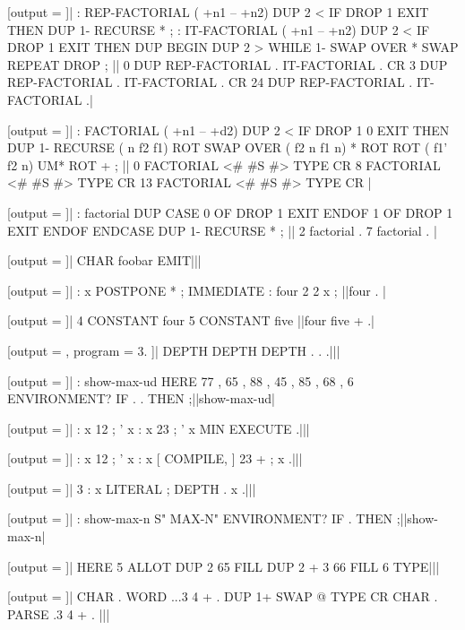 [output = \result]|
  : REP-FACTORIAL ( +n1 -- +n2)
  DUP 2 < IF DROP 1 EXIT THEN
  DUP 1- RECURSE *
  ;
  : IT-FACTORIAL ( +n1 -- +n2)
  DUP 2 < IF DROP 1 EXIT THEN
  DUP
  BEGIN DUP 2 > WHILE
  1- SWAP OVER * SWAP
  REPEAT DROP
  ;
||
0 DUP REP-FACTORIAL . IT-FACTORIAL . CR
3 DUP REP-FACTORIAL . IT-FACTORIAL . CR
24 DUP REP-FACTORIAL . IT-FACTORIAL .|
\typeout{\result}

[output = \result]|
  : FACTORIAL ( +n1 -- +d2)
  DUP 2 < IF DROP 1 0 EXIT THEN
  DUP 1- RECURSE ( n f2 f1)
  ROT SWAP OVER ( f2 n f1 n)
  * ROT ROT ( f1' f2 n)
  UM* ROT +
  ;
||
0 FACTORIAL <# #S #> TYPE CR
8 FACTORIAL <# #S #> TYPE CR
13 FACTORIAL <# #S #> TYPE CR
|
\typeout{\result}

[output = \result]|
  : factorial DUP
  CASE
    0 OF DROP 1 EXIT ENDOF
    1 OF DROP 1 EXIT ENDOF
  ENDCASE
  DUP 1- RECURSE * ;
||
  2 factorial .
  7 factorial .
|
\typeout{\result}

[output = \result]|
  CHAR foobar EMIT|||
\typeout{\result}

[output = \result]|
  : x POSTPONE * ; IMMEDIATE
  : four 2 2 x ;
||four . |
\typeout{\result}

[output = \result]|
  4 CONSTANT four
  5 CONSTANT five
||four five + .|
\typeout{\result}

[output = \result, program = { 3\space . }]|
  DEPTH DEPTH DEPTH . . .|||
\typeout{\result}

[output = \result]|
  : show-max-ud HERE 77 , 65 , 88 , 45 , 85 , 68 ,
    6 ENVIRONMENT? IF . . THEN ;||show-max-ud|
\typeout{\result}

[output = \result]|
  : x 12 ; ' x
  : x 23 ; ' x
  MIN EXECUTE .|||
\typeout{\result}

[output = \result]|
  : x 12 ; ' x
  : x [ COMPILE, ] 23 + ; x .|||
\typeout{\result}

[output = \result]|
  3 : x LITERAL ; DEPTH . x .|||
\typeout{\result}

[output = \result]|
  : show-max-n S" MAX-N" ENVIRONMENT? IF . THEN ;||show-max-n|
\typeout{\result}

[output = \result]|
  HERE 5 ALLOT
  DUP 2 65 FILL
  DUP 2 + 3 66 FILL
  6 TYPE|||
\typeout{\result}

[output = \result]|
  CHAR . WORD ...3 4 + . DUP 1+ SWAP @ TYPE CR
  CHAR . PARSE .3 4 + .
|||
\typeout{\result}

